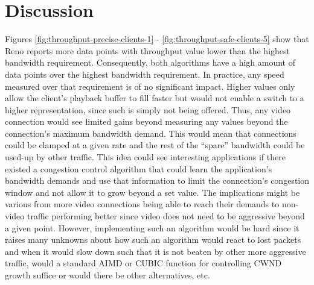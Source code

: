 \documentclass[10pt,sigconf]{acmart}
\begin{document}



\section{Discussion}

Figures \ref{fig:throughput-precise-clients-1} - \ref{fig:throughput-safe-clients-5} show that Reno reports more data points with throughput value lower than the highest bandwidth requirement. Consequently, both algorithms have a high amount of data points over the highest bandwidth requirement. In practice, any speed measured over that requirement is of no significant impact. Higher values only allow the client's playback buffer to fill faster but would not enable a switch to a higher representation, since such is simply not being offered. Thus, any video connection would see limited gains beyond measuring any values beyond the connection's maximum bandwidth demand. This would mean that connections could be clamped at a given rate and the rest of the ``spare'' bandwidth could be used-up by other traffic. This idea could see interesting applications if there existed a congestion control algorithm that could learn the application's bandwidth demands and use that information to limit the connection's congestion window and not allow it to grow beyond a set value. The implications might be various from more video connections being able to reach their demands to non-video traffic performing better since video does not need to be aggressive beyond a given point. However, implementing such an algorithm would be hard since it raises many unknowns about how such an algorithm would react to lost packets and when it would slow down such that it is not beaten by other more aggressive traffic, would a standard AIMD or CUBIC function for controlling CWND growth suffice or would there be other alternatives, etc.
\end{document}
